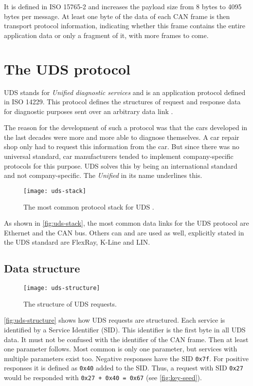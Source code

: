 It is defined in ISO 15765-2 and increases the payload size from 8 bytes to 4095 bytes per message. At least one byte of the data of each CAN frame is then transport protocol information, indicating whether this frame contains the entire application data or only a fragment of it, with more frames to come.

\section{The UDS protocol}
\label{sec:uds}

UDS stands for \emph{Unified diagnostic services} and is an application protocol defined in ISO 14229. This protocol defines the structures of request and response data for diagnostic purposes sent over an arbitrary data link \cite{iso14229}.

The reason for the development of such a protocol was that the cars developed in the last decades were more and more able to diagnose themselves. A car repair shop only had to request this information from the car. But since there was no universal standard, car manufacturers tended to implement company-specific protocols for this purpose. UDS solves this by being an international standard and not company-specific. The \emph{Unified} in its name underlines this. 

\begin{figure}[htb]
    \centering
    \texttt{[image: uds-stack]}
    \caption{The most common protocol stack for UDS \cite{Weiss2020}.}
    \label{fig:uds-stack}
\end{figure}

As shown in \autoref{fig:uds-stack}, the most common data links for the UDS protocol are Ethernet and the CAN bus. Others can and are used as well, explicitly stated in the UDS standard are FlexRay, K-Line and LIN.

\subsection{Data structure}

\begin{figure}[htb]
    \centering
    \texttt{[image: uds-structure]}
    \caption{The structure of UDS requests.}
    \label{fig:uds-structure}
\end{figure}

\autoref{fig:uds-structure} shows how UDS requests are structured. Each service is identified by a Service Identifier (SID). This identifier is the first byte in all UDS data. It must not be confused with the identifier of the CAN frame. Then at least one parameter follows. Most common is only one parameter, but services with multiple parameters exist too.
Negative responses have the SID \texttt{0x7f}.
For positive responses it is defined as \texttt{0x40} added to the SID. Thus, a request with SID \texttt{0x27} would be responded with \texttt{0x27 + 0x40 = 0x67} (see \autoref{fig:key-seed}).

